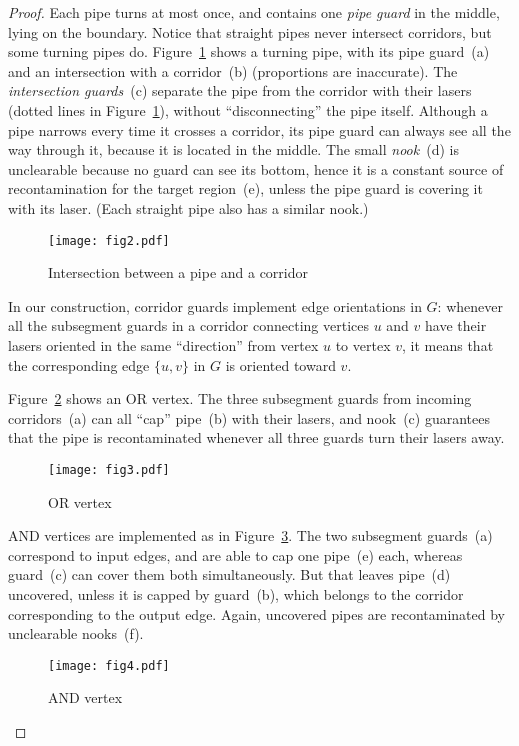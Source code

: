\documentclass{style}
\begin{document}
\begin{proof}
Each pipe turns at most once, and contains one \emph{pipe guard} in the middle, lying on the boundary. Notice that straight pipes never intersect corridors, but some turning pipes do. Figure~\ref{fig2} shows a turning pipe, with its pipe guard~(a) and an intersection with a corridor~(b) (proportions are inaccurate). The \emph{intersection guards}~(c) separate the pipe from the corridor with their lasers (dotted lines in Figure~\ref{fig2}), without ``disconnecting'' the pipe itself. Although a pipe narrows every time it crosses a corridor, its pipe guard can always see all the way through it, because it is located in the middle. The small \emph{nook}~(d) is unclearable because no guard can see its bottom, hence it is a constant source of recontamination for the target region~(e), unless the pipe guard is covering it with its laser. (Each straight pipe also has a similar nook.)

\begin{figure}[h]
\centering
\texttt{[image: fig2.pdf]}
\caption{Intersection between a pipe and a corridor}
\label{fig2}
\end{figure}

In our construction, corridor guards implement edge orientations in $G$: whenever all the subsegment guards in a corridor connecting vertices $u$ and $v$ have their lasers oriented in the same ``direction'' from vertex $u$ to vertex $v$, it means that the corresponding edge $\{u,v\}$ in $G$ is oriented toward $v$.

Figure~\ref{fig3} shows an OR vertex. The three subsegment guards from incoming corridors~(a) can all ``cap'' pipe~(b) with their lasers, and nook~(c) guarantees that the pipe is recontaminated whenever all three guards turn their lasers away.

\begin{figure}[h]
\centering
\texttt{[image: fig3.pdf]}
\caption{OR vertex}
\label{fig3}
\end{figure}

AND vertices are implemented as in Figure~\ref{fig4}. The two subsegment guards~(a) correspond to input edges, and are able to cap one pipe~(e) each, whereas guard~(c) can cover them both simultaneously. But that leaves pipe~(d) uncovered, unless it is capped by guard~(b), which belongs to the corridor corresponding to the output edge. Again, uncovered pipes are recontaminated by unclearable nooks~(f).

\begin{figure}[h]
\centering
\texttt{[image: fig4.pdf]}
\caption{AND vertex}
\label{fig4}
\end{figure}


\end{proof}
\end{document}
